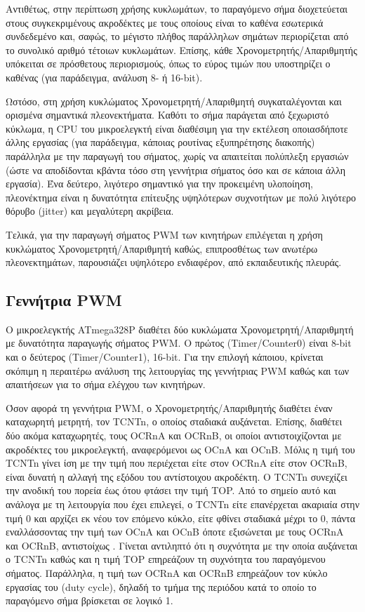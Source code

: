 Αντιθέτως, στην περίπτωση χρήσης κυκλωμάτων, το παραγόμενο σήμα διοχετεύεται
στους συγκεκριμένους ακροδέκτες με τους οποίους είναι το καθένα εσωτερικά
συνδεδεμένο και, σαφώς, το μέγιστο πλήθος παράλληλων σημάτων περιορίζεται από το
συνολικό αριθμό τέτοιων κυκλωμάτων. Επίσης, κάθε Χρονομετρητής\slash Απαριθμητής
υπόκειται σε πρόσθετους περιορισμούς, όπως το εύρος τιμών που υποστηρίζει ο
καθένας (για παράδειγμα, ανάλυση 8- ή 16-bit).

Ωστόσο, στη χρήση κυκλώματος Χρονομετρητή\slash Απαριθμητή συγκαταλέγονται και
ορισμένα σημαντικά πλεονεκτήματα.
Καθότι το σήμα παράγεται από ξεχωριστό κύκλωμα, η CPU του μικροελεγκτή είναι
διαθέσιμη για την εκτέλεση οποιασδήποτε άλλης εργασίας (για παράδειγμα, κάποιας
ρουτίνας εξυπηρέτησης διακοπής) παράλληλα με την παραγωγή του σήματος, χωρίς να
απαιτείται πολύπλεξη εργασιών (ώστε να αποδίδονται κβάντα τόσο στη γεννήτρια
σήματος όσο και σε κάποια άλλη εργασία). Ένα δεύτερο, λιγότερο σημαντικό για την
προκειμένη υλοποίηση, πλεονέκτημα είναι η δυνατότητα επίτευξης υψηλότερων
συχνοτήτων με πολύ λιγότερο θόρυβο (\textenglish{jitter}) και μεγαλύτερη
ακρίβεια.

Τελικά, για την παραγωγή σήματος PWM των κινητήρων επιλέγεται η χρήση κυκλώματος
Χρονομετρητή\slash Απαριθμητή καθώς, επιπροσθέτως των ανωτέρω πλεονεκτημάτων,
παρουσιάζει υψηλότερο ενδιαφέρον, από εκπαιδευτικής πλευράς.


\subsection{Γεννήτρια PWM}

Ο μικροελεγκτής ATmega328P διαθέτει δύο κυκλώματα Χρονομετρητή\slash Απαριθμητή
με δυνατότητα παραγωγής σήματος PWM. Ο πρώτος (Timer\slash Counter0) είναι 8-bit
και ο δεύτερος (Timer\slash Counter1), 16-bit. Για την επιλογή κάποιου, κρίνεται
σκόπιμη η περαιτέρω ανάλυση της λειτουργίας της γεννήτριας PWM καθώς και των
απαιτήσεων για το σήμα ελέγχου των κινητήρων.

Όσον αφορά τη γεννήτρια PWM, ο Χρονομετρητής\slash Απαριθμητής διαθέτει έναν
καταχωρητή μετρητή, τον TCNTn, ο οποίος σταδιακά αυξάνεται. Επίσης, διαθέτει
δύο ακόμα καταχωρητές, τους OCRnA και OCRnB, οι οποίοι αντιστοιχίζονται με
ακροδέκτες του μικροελεγκτή, αναφερόμενοι ως OCnA και OCnB. Μόλις η τιμή του
TCNTn γίνει ίση με την τιμή που περιέχεται είτε στον OCRnA είτε στον OCRnB,
είναι δυνατή η αλλαγή της εξόδου του αντίστοιχου ακροδέκτη. Ο TCNTn συνεχίζει
την ανοδική του πορεία έως ότου φτάσει την τιμή TOP. Από το σημείο αυτό και
ανάλογα με τη λειτουργία που έχει επιλεγεί, ο TCNTn είτε επανέρχεται ακαριαία
στην τιμή 0 και αρχίζει εκ νέου τον επόμενο κύκλο, είτε φθίνει σταδιακά μέχρι το
0, πάντα εναλλάσσοντας την τιμή των OCnA και OCnB όποτε εξισώνεται με τους OCRnA
και OCRnB, αντιστοίχως \parencite[100--102,124--129]{atmel13}.
Γίνεται αντιληπτό ότι η συχνότητα με την οποία αυξάνεται ο TCNTn καθώς και η
τιμή TOP επηρεάζουν τη συχνότητα του παραγόμενου σήματος. Παράλληλα, η τιμή των
OCRnA και OCRnB επηρεάζουν τον κύκλο εργασίας του (\textenglish{duty cycle}),
δηλαδή το τμήμα της περιόδου κατά το οποίο το παραγόμενο σήμα βρίσκεται σε
λογικό 1.

